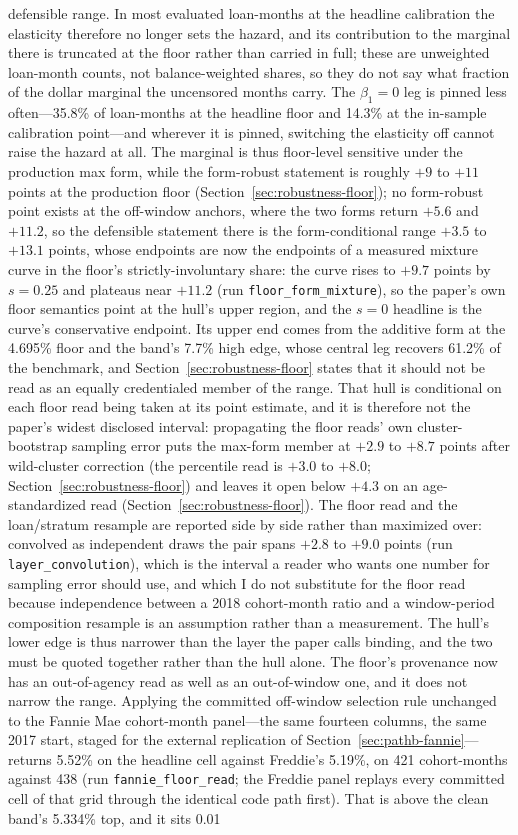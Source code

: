 \documentclass[12pt]{article}
\begin{document}
defensible range. In most evaluated loan-months at the headline calibration the elasticity therefore no longer sets the hazard, and its contribution to the marginal there is truncated at the floor rather than carried in full; these are unweighted loan-month counts, not balance-weighted shares, so they do not say what fraction of the dollar marginal the uncensored months carry. The $\beta_1 = 0$ leg is pinned less often---35.8\% of loan-months at the headline floor and 14.3\% at the in-sample calibration point---and wherever it is pinned, switching the elasticity off cannot raise the hazard at all. The marginal is thus floor-level sensitive under the production max form, while the form-robust statement is roughly $+9$ to $+11$ points at the production floor (Section~\ref{sec:robustness-floor}); no form-robust point exists at the off-window anchors, where the two forms return $+5.6$ and $+11.2$, so the defensible statement there is the form-conditional range $+3.5$ to $+13.1$ points, whose endpoints are now the endpoints of a measured mixture curve in the floor's strictly-involuntary share: the curve rises to $+9.7$ points by $s = 0.25$ and plateaus near $+11.2$ (run \texttt{floor\_form\_mixture}), so the paper's own floor semantics point at the hull's upper region, and the $s = 0$ headline is the curve's conservative endpoint. Its upper end comes from the additive form at the 4.695\% floor and the band's 7.7\% high edge, whose central leg recovers 61.2\% of the benchmark, and Section~\ref{sec:robustness-floor} states that it should not be read as an equally credentialed member of the range. That hull is conditional on each floor read being taken at its point estimate, and it is therefore not the paper's widest disclosed interval: propagating the floor reads' own cluster-bootstrap sampling error puts the max-form member at $+2.9$ to $+8.7$ points after wild-cluster correction (the percentile read is $+3.0$ to $+8.0$; Section~\ref{sec:robustness-floor}) and leaves it open below $+4.3$ on an age-standardized read (Section~\ref{sec:robustness-floor}). The floor read and the loan/stratum resample are reported side by side rather than maximized over: convolved as independent draws the pair spans $+2.8$ to $+9.0$ points (run \texttt{layer\_convolution}), which is the interval a reader who wants one number for sampling error should use, and which I do not substitute for the floor read because independence between a 2018 cohort-month ratio and a window-period composition resample is an assumption rather than a measurement. The hull's lower edge is thus narrower than the layer the paper calls binding, and the two must be quoted together rather than the hull alone. The floor's provenance now has an out-of-agency read as well as an out-of-window one, and it does not narrow the range. Applying the committed off-window selection rule unchanged to the Fannie Mae cohort-month panel---the same fourteen columns, the same 2017 start, staged for the external replication of Section~\ref{sec:pathb-fannie}---returns 5.52\% on the headline cell against Freddie's 5.19\%, on 421 cohort-months against 438 (run \texttt{fannie\_floor\_read}; the Freddie panel replays every committed cell of that grid through the identical code path first). That is above the clean band's 5.334\% top, and it sits 0.01 
\end{document}
